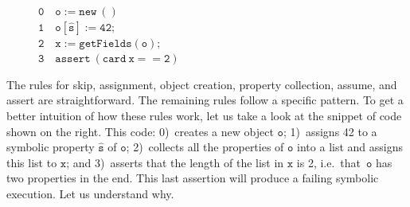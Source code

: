 \begin{figure}
\vspace*{-0.7cm}
{\small
\hspace*{0.25cm} $\mathtt{0\quad o := new\ ()}$ \\
\hspace*{0.25cm} $\mathtt{1\quad o[\hat{s}] := 42};$ \\
\hspace*{0.25cm} $\mathtt{2\quad x := getFields(o);}$ \\
\hspace*{0.25cm} $\mathtt{3\quad assert\ (card \ x == 2)}$
}
\vspace*{-0.5cm}
\end{figure}
The rules for skip, assignment, object creation, property collection, assume, and assert are straightforward. The remaining rules follow a specific pattern. To get a better intuition of how these rules work, let us take a look at the snippet of code shown on the right. 
This code: 
	0)~creates a new object $\mathtt{o}$;
	1)~assigns 42 to a symbolic property $\mathtt{\hat{s}}$ of $\mathtt{o}$; 
	2)~collects all the properties of $\mathtt{o}$ into a list and assigns this list to $\mathtt{x}$; and
	3)~asserts that the length of the list in $\mathtt{x}$ is 2, i.e.~that~$\mathtt{o}$ has two properties in the end. This last assertion will produce a failing symbolic execution. Let us understand why.

